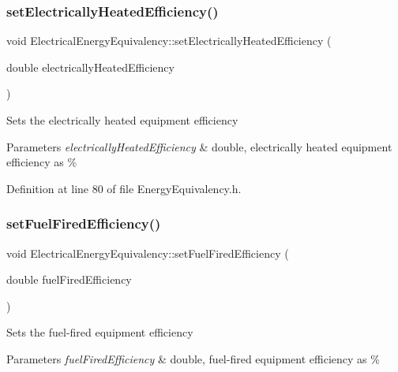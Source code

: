 \subsubsection{\texorpdfstring{set\+Electrically\+Heated\+Efficiency()}{setElectricallyHeatedEfficiency()}\hspace{0.1cm}{\footnotesize\ttfamily [3/3]}}
{\footnotesize\ttfamily void Electrical\+Energy\+Equivalency\+::set\+Electrically\+Heated\+Efficiency (\begin{DoxyParamCaption}\item[{double}]{electrically\+Heated\+Efficiency }\end{DoxyParamCaption})\hspace{0.3cm}{\ttfamily [inline]}}

Sets the electrically heated equipment efficiency


\begin{DoxyParams}{Parameters}
{\em electrically\+Heated\+Efficiency} & double, electrically heated equipment efficiency as \% \\
\hline
\end{DoxyParams}


Definition at line 80 of file Energy\+Equivalency.\+h.

\mbox{\label{class_electrical_energy_equivalency_ac73a4dadfeeff737a24b58e805ce9a3a}} 
\subsubsection{\texorpdfstring{set\+Fuel\+Fired\+Efficiency()}{setFuelFiredEfficiency()}\hspace{0.1cm}{\footnotesize\ttfamily [1/3]}}
{\footnotesize\ttfamily void Electrical\+Energy\+Equivalency\+::set\+Fuel\+Fired\+Efficiency (\begin{DoxyParamCaption}\item[{double}]{fuel\+Fired\+Efficiency }\end{DoxyParamCaption})\hspace{0.3cm}{\ttfamily [inline]}}

Sets the fuel-\/fired equipment efficiency


\begin{DoxyParams}{Parameters}
{\em fuel\+Fired\+Efficiency} & double, fuel-\/fired equipment efficiency as \% \\
\hline
\end{DoxyParams}


